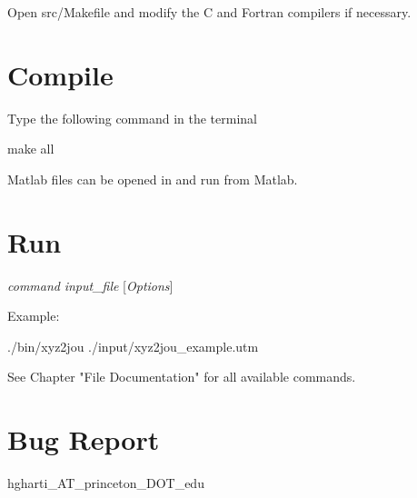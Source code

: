 Open src/Makefile and modify the C and Fortran compilers if necessary.

\section{Compile}

Type the following command in the terminal

make all

Matlab files can be opened in and run from Matlab.

\section{Run}

{\em command} {\em input\_file} [{\em Options}]

Example:

./bin/xyz2jou ./input/xyz2jou\_example.utm

See Chapter "File Documentation" for all available commands. 

\section{Bug Report}

hgharti\_AT\_princeton\_DOT\_edu
